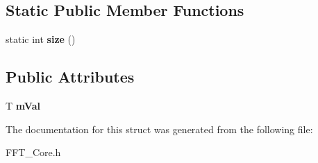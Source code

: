 \subsection*{Static Public Member Functions}
\begin{DoxyCompactItemize}
\item 
\mbox{\label{struct_scalar_a096df3d95a22beafbeb6cc3cf2eed643}} 
static int {\bfseries size} ()
\end{DoxyCompactItemize}
\subsection*{Public Attributes}
\begin{DoxyCompactItemize}
\item 
\mbox{\label{struct_scalar_a0e7920c8e8f4363ddf1d2a336fdb9b04}} 
T {\bfseries m\+Val}
\end{DoxyCompactItemize}


The documentation for this struct was generated from the following file\+:\begin{DoxyCompactItemize}
\item 
F\+F\+T\+\_\+\+Core.\+h\end{DoxyCompactItemize}
